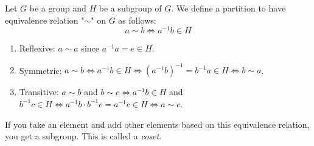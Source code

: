 \begin{definition}
    Let $G$ be a group and $H$ be a subgroup of $G$. We define a partition to have equivalence relation "$\sim$" on $G$ as follows:
    \[a \sim b \Leftrightarrow a^{-1}b \in H\]
    \begin{enumerate}
        \item Reflexive: $a \sim a$ since $a^{-1}a = e \in H$.
        \item Symmetric: $a \sim b \Leftrightarrow a^{-1}b \in H \Leftrightarrow (a^{-1}b)^{-1} = b^{-1}a \in H \Leftrightarrow b \sim a$.
        \item Transitive: $a \sim b$ and $b \sim c \Leftrightarrow a^{-1}b \in H$ and $b^{-1}c \in H \Leftrightarrow a^{-1}b \cdot b^{-1}c = a^{-1}c \in H \Leftrightarrow a \sim c$.
    \end{enumerate}
    If you take an element and add other elements based on this equivalence relation, you get a subgroup. This is called a \textit{coset}.
\end{definition}





